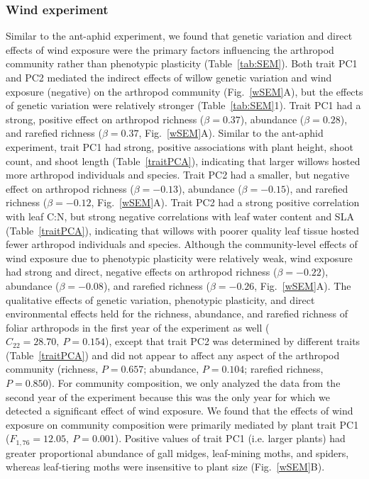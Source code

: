 \documentclass[11pt]{article}
\begin{document}
\subsubsection*{Wind experiment}

Similar to the ant-aphid experiment, we found that genetic
variation and direct effects of wind exposure were the primary factors
influencing the arthropod community rather than phenotypic plasticity
(Table~\ref{tab:SEM}). Both trait PC1 and PC2 mediated the indirect effects of
willow genetic variation and wind exposure (negative) on the arthropod
community (Fig.~\ref{wSEM}A), but the effects of genetic variation were
relatively stronger (Table~\ref{tab:SEM}1). Trait PC1 had a strong, positive effect
on arthropod richness ($\beta = 0.37$), abundance ($\beta =
0.28$), and rarefied richness ($\beta = 0.37$, Fig.~\ref{wSEM}A). Similar to the
ant-aphid experiment, trait PC1 had strong, positive associations with
plant height, shoot count, and shoot length (Table~\ref{traitPCA}), indicating that
larger willows hosted more arthropod individuals and species. Trait PC2 had a smaller,
but negative effect on arthropod richness ($\beta = -0.13$),
abundance ($\beta = -0.15$), and rarefied richness ($\beta =
-0.12$, Fig.~\ref{wSEM}A). Trait PC2 had a strong positive correlation with leaf
C:N, but strong negative correlations with leaf water content and SLA
(Table~\ref{traitPCA}), indicating that willows with poorer quality leaf tissue
hosted fewer arthropod individuals and species. Although the community-level effects of
wind exposure due to phenotypic plasticity were relatively weak, wind
exposure had strong and direct, negative effects on arthropod richness
($\beta = -0.22$), abundance ($\beta = -0.08$), and rarefied
richness ($\beta = -0.26$, Fig.~\ref{wSEM}A). The qualitative effects of
genetic variation, phenotypic plasticity, and direct
environmental effects held for the richness, abundance, and rarefied
richness of foliar arthropods in the first year of the experiment as
well (\(C_{22}=28.70,\ P=0.154\)), except that trait PC2 was determined by
different traits (Table~\ref{traitPCA}) and did not appear to affect any aspect of
the arthropod community (richness, \(P=0.657\); abundance,
\(P=0.104\); rarefied richness, \(P=0.850\)). For community
composition, we only analyzed the data from the second year of the
experiment because this was the only year for which we detected a
significant effect of wind exposure. We found that the effects of wind
exposure on community composition were primarily mediated by plant trait
PC1 (\(F_{1,76}=12.05,\ P=0.001\)). Positive values of trait PC1 (i.e. larger
plants) had greater proportional abundance of gall midges, leaf-mining
moths, and spiders, whereas leaf-tiering moths were insensitive to plant
size (Fig.~\ref{wSEM}B).
\end{document}
